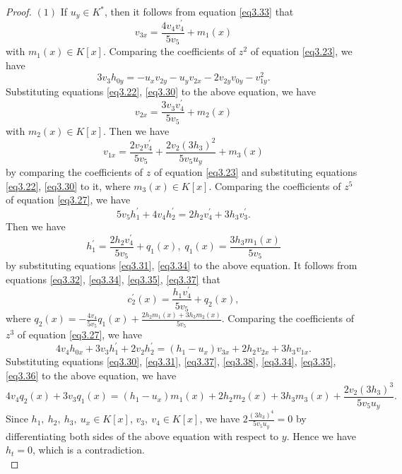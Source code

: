\documentclass[12pt, twoside, leqno]{article}
\theoremstyle{definition}
\numberwithin{equation}{section}
\begin{document}
\begin{proof}
$(1)$ If $u_y\in K^*$, then it follows from  equation \eqref{eq3.33} that
\begin{equation}\label{eq3.34}
v_{3x}=\frac{4v_4v_4^{'}}{5v_5}+m_1(x)
\end{equation}
with $m_1(x)\in K[x]$. Comparing the coefficients of $z^2$ of equation \eqref{eq3.23}, we have
$$3v_3h_{0y}=-u_xv_{2y}-u_yv_{2x}-2v_{2y}v_{0y}-v_{1y}^2.$$
Substituting equations \eqref{eq3.22}, \eqref{eq3.30} to the above equation, we have
\begin{equation}\label{eq3.35}
v_{2x}=\frac{3v_3v_4^{'}}{5v_5}+m_2(x)
\end{equation}
with $m_2(x)\in K[x]$. Then we have
\begin{equation}\label{eq3.36}
v_{1x}=\frac{2v_2v_4^{'}}{5v_5}+\frac{2v_2(3h_3)^2}{5v_5u_y}+m_3(x)
\end{equation}
by comparing the coefficients of $z$ of equation \eqref{eq3.23} and substituting equations \eqref{eq3.22}, \eqref{eq3.30} to it, where $m_3(x)\in K[x]$. Comparing the coefficients of $z^5$ of equation \eqref{eq3.27}, we have
$$5v_{5}h_{1}^{'}+4v_{4}h_{2}^{'}=2h_{2}v_{4}^{'}+3h_{3}v_{3}^{'}.$$
Then we have
\begin{equation}\label{eq3.37}
h_{1}^{'}=\frac{2h_{2}v_{4}^{'}}{5v_{5}}+q_{1}(x),\;q_{1}(x)=\frac{3h_{3}m_{1}(x)}{5v_{5}}
\end{equation}
by substituting equations \eqref{eq3.31}, \eqref{eq3.34} to the above equation. It follows from equations \eqref{eq3.32}, \eqref{eq3.34}, \eqref{eq3.35}, \eqref{eq3.37} that
\begin{equation}\label{eq3.38}
c_{2}^{'}(x)=\frac{h_1v_{4}^{'}}{5v_{5}}+q_{2}(x),
\end{equation}
where $q_{2}(x)=-\frac{4v_4}{5v_5}q_1(x)+\frac{2h_{2}m_{1}(x)+3h_3m_2(x)}{5v_{5}}$. Comparing the coefficients of $z^3$ of equation \eqref{eq3.27}, we have
\begin{equation}\label{eq3.39}
4v_{4}h_{0x}+3v_{3}h_{1}^{'}+2v_{2}h_{2}^{'}=(h_{1}-u_{x})v_{3x}+2h_{2}v_{2x}+3h_{3}v_{1x}.
\end{equation}
Substituting equations \eqref{eq3.30}, \eqref{eq3.31}, \eqref{eq3.37}, \eqref{eq3.38}, \eqref{eq3.34}, \eqref{eq3.35}, \eqref{eq3.36} to the above equation, we have
$$4v_4q_2(x)+3v_3q_1(x)=(h_1-u_x)m_1(x)+2h_2m_2(x)+3h_3m_3(x)+\frac{2v_2(3h_3)^3}{5v_5u_y}.$$
Since $h_1,~h_2,~h_3,~u_x \in K[x]$, $v_3,~v_4\in K[x]$, we have $2\frac{(3h_3)^4}{5v_5u_y}=0$ by differentiating both sides of the above equation with respect to $y$. Hence we have $h_t=0$, which is a contradiction. \\


\end{proof}
\end{document}
